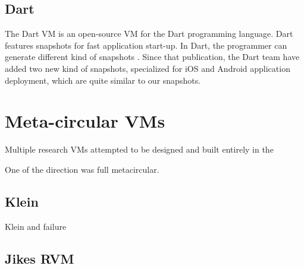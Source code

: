 \documentclass[a4paper,12pt,twoside]{../includes/ThesisStyle}
\begin{document}
\subsection{Dart}
The Dart VM is an open-source VM for the Dart programming language. Dart features snapshots for fast application start-up. In Dart, the programmer can generate different kind of snapshots \cite{Anna13a}. Since that publication, the Dart team have added two new kind of snapshots, specialized for iOS and Android application deployment, which are quite similar to our snapshots.




\section{Meta-circular VMs}

Multiple research VMs attempted to be designed and built entirely in the 

One of the direction was full metacircular.

\subsection{Klein}

Klein and failure ~\cite{Unga05b}

\subsection{Jikes RVM}
\end{document}
